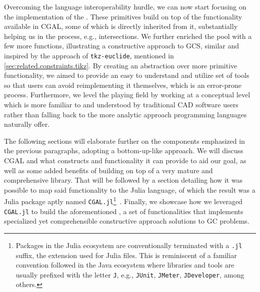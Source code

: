Overcoming the language interoperability hurdle, we can now start focusing on
the implementation of the \primitives{}.  These primitives build on top of the
functionality available in \ac{CGAL}, some of which is directly inherited from
it, substantially helping us in the process, e.g., intersections.  We further
enriched the pool with a few more functions, illustrating a constructive
approach to \ac{GCS}, similar and inspired by the approach of
\texttt{tkz-euclide}, mentioned in \cref{sec:related.constraints.tikz}.  By
creating an abstraction over more primitive functionality, we aimed to provide
an easy to understand and utilize set of tools so that users can avoid
reimplementing it themselves, which is an error-prone process.  Furthermore, we
level the playing field by working at a conceptual level which is more familiar
to and understood by traditional \ac{CAD} software users rather than falling
back to the more analytic approach programming languages naturally offer.

The following sections will elaborate further on the components emphasized in
the previous paragraphs, adopting a bottom-up-like approach.  We will discuss
\ac{CGAL} and what constructs and functionality it can provide to aid our goal,
as well as some added benefits of building on top of a very mature and
comprehensive library.  That will be followed by a section detailing how it was
possible to map said functionality to the Julia language, of which the result
was a Julia package aptly named \texttt{CGAL.jl}\footnote{Packages in the Julia
ecosystem are conventionally terminated with a \texttt{.jl} suffix, the
extension used for Julia files.  This is reminiscent of a familiar convention
followed in the Java ecosystem where libraries and tools are usually prefixed
with the letter \texttt{J}, e.g., \texttt{JUnit}, \texttt{JMeter},
\texttt{JDeveloper}, among others.}~\cite{Ventura:2021:CGAL.jl}.  Finally, we
showcase how we leveraged \texttt{CGAL.jl} to build the aforementioned
\primitives{}, a set of functionalities that implements specialized yet
comprehensible constructive approach solutions to \ac{GC} problems.




